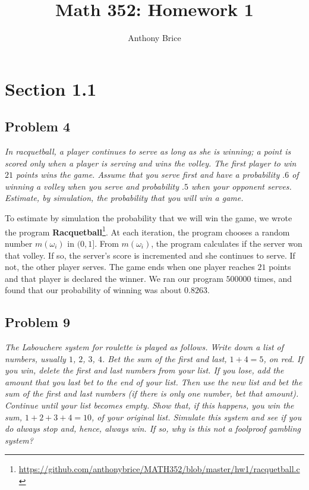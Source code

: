 \documentclass{tufte-handout}
\title{Math 352: Homework 1}
\author{Anthony Brice}
\begin{document}
\maketitle
\section{Section 1.1}
\subsection{Problem 4}
\begin{description}
\item \textit{In racquetball, a player continues to serve as long as
    she is winning; a point is scored only when a player is serving
    and wins the volley. The first player to win $21$ points wins the
    game. Assume that you serve first and have a probability $.6$ of
    winning a volley when you serve and probability $.5$ when your
    opponent serves. Estimate, by simulation, the probability that you
    will win a game.}
\end{description}  

To estimate by simulation the probability that we will win the game,
we wrote the program \textbf{Racquetball}\footnote{
  \url{https://github.com/anthonybrice/MATH352/blob/master/hw1/racquetball.c}}.
At each iteration, the program chooses a random number $m(\omega_i)$
in $(0,1]$. From $m(\omega_i)$, the program calculates if the server
won that volley. If so, the server's score is incremented and she
continues to serve. If not, the other player serves. The game ends
when one player reaches $21$ points and that player is declared the
winner. We ran our program $500000$ times, and found that our
probability of winning was about $0.8263$.

\subsection{Problem 9}
\begin{description}
\item \textit{The \textit{Labouchere system} for roulette is played as
    follows. Write down a list of numbers, usually $1$, $2$, $3$,
    $4$. Bet the sum of the first and last, $1+4 = 5$, on red. If you
    win, delete the first and last numbers from your list. If you
    lose, add the amount that you last bet to the end of your
    list. Then use the new list and bet the sum of the first and last
    numbers (if there is only one number, bet that amount). Continue
    until your list becomes empty. Show that, if this happens, you win
    the sum, $1+2+3+4 = 10$, of your original list. Simulate this
    system and see if you do always stop and, hence, always win. If
    so, why is this not a foolproof gambling system?}
\end{description}
\end{document}
